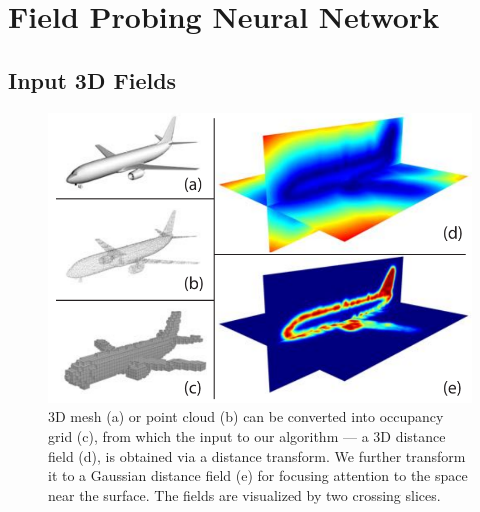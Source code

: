 \section{Field Probing Neural Network}
\label{sec:fpnn}


\subsection{Input 3D Fields}
\label{sec:input_3d_fields}

\begin{figure}
	\vspace{-2.9cm}
	\begin{center}
		\includegraphics[width=0.9\linewidth]{figures/3d_data_representations}
	\end{center}
	\vspace{-0.5cm}
	\caption{3D mesh (a) or point cloud (b) can be converted into occupancy grid (c), from which the input to our algorithm --- a 3D distance field (d), is obtained via a distance transform. We further transform it to a Gaussian distance field (e) for focusing attention to the space near the surface. The fields are visualized by two crossing slices.}
	\label{fig:3d_data_representations}
	\vspace{-0.4cm}
\end{figure}

